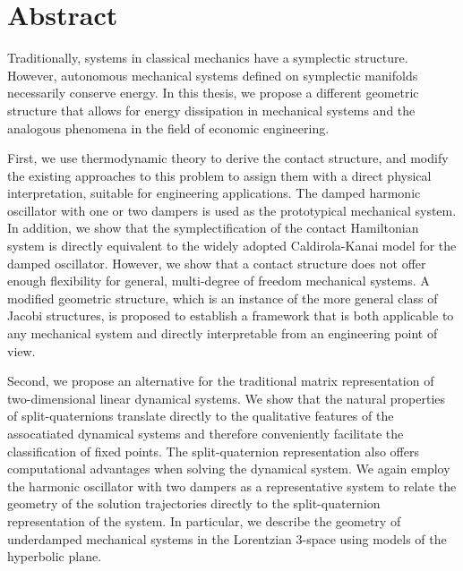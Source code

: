\chapter*{Abstract}%

Traditionally, systems in classical mechanics have a symplectic structure. 
However, autonomous mechanical systems defined on symplectic manifolds necessarily conserve energy.
In this thesis, we propose a different geometric structure that allows for energy dissipation in mechanical systems and the analogous phenomena in the field of economic engineering. 

First, we use thermodynamic theory to derive the contact structure, and modify the existing approaches to this problem to assign them with a direct physical interpretation, suitable for engineering applications. 
The damped harmonic oscillator with one or two dampers is used as the prototypical mechanical system. 
In addition, we show that the symplectification of the contact Hamiltonian system is directly equivalent to the widely adopted Caldirola-Kanai model for the damped oscillator.
However, we show that a contact structure does not offer enough flexibility for general, multi-degree of freedom mechanical systems.
A modified geometric structure, which is an instance of the more general class of Jacobi structures, is proposed to establish a framework that is both applicable to any mechanical system and directly interpretable from an engineering point of view.

Second, we propose an alternative for the traditional matrix representation of two-dimensional linear dynamical systems. 
We show that the natural properties of split-quaternions translate directly to the qualitative features of the assocatiated dynamical systems and therefore conveniently facilitate the classification of fixed points. The split-quaternion representation also offers computational advantages when solving the dynamical system.
We again employ the harmonic oscillator with two dampers as a representative system to relate the geometry of the solution trajectories directly to the split-quaternion representation of the system. In particular, we describe the geometry of underdamped mechanical systems in the Lorentzian 3-space using models of the hyperbolic plane.

 
